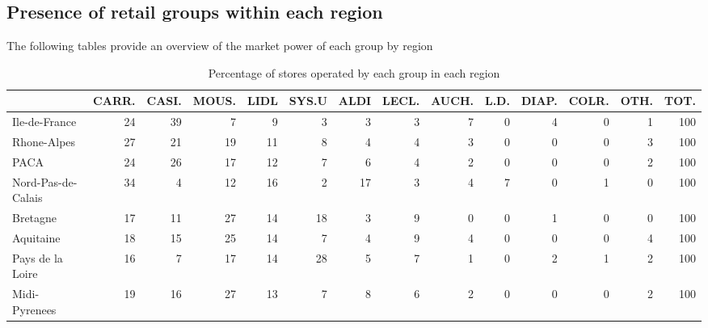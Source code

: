 \documentclass[11pt]{article}
\begin{document}
\subsection{Presence of retail groups within each region}

The following tables provide an overview of the market power of each group by region

\begin{table}[H]
\caption{Percentage of stores operated by each group in each region}
\footnotesize
\setlength{\tabcolsep}{2pt}

\begin{tabular}{lrrrrrrrrrrrrr}
\toprule
\toprule
{} &      CARR. &      CASI. &      MOUS. &       LIDL &      SYS.U &       ALDI &      LECL. &      AUCH. &       L.D. &      DIAP. &      COLR. &       OTH. &       TOT. \\
\midrule
Ile-de-France        &         24 &         39 &          7 &          9 &          3 &          3 &          3 &          7 &          0 &          4 &          0 &          1 &        100 \\
Rhone-Alpes          &         27 &         21 &         19 &         11 &          8 &          4 &          4 &          3 &          0 &          0 &          0 &          3 &        100 \\
PACA                 &         24 &         26 &         17 &         12 &          7 &          6 &          4 &          2 &          0 &          0 &          0 &          2 &        100 \\
Nord-Pas-de-Calais   &         34 &          4 &         12 &         16 &          2 &         17 &          3 &          4 &          7 &          0 &          1 &          0 &        100 \\
Bretagne             &         17 &         11 &         27 &         14 &         18 &          3 &          9 &          0 &          0 &          1 &          0 &          0 &        100 \\
Aquitaine            &         18 &         15 &         25 &         14 &          7 &          4 &          9 &          4 &          0 &          0 &          0 &          4 &        100 \\
Pays de la Loire     &         16 &          7 &         17 &         14 &         28 &          5 &          7 &          1 &          0 &          2 &          1 &          2 &        100 \\
Midi-Pyrenees        &         19 &         16 &         27 &         13 &          7 &          8 &          6 &          2 &          0 &          0 &          0 &          2 &        100 \\

\end{tabular}
\end{table}
\end{document}
